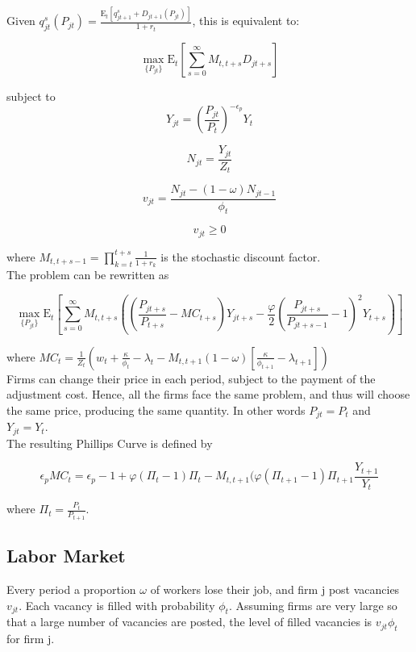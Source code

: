 \documentclass[titlepage]{\econtex}\providecommand{\texname}{Dissertation-Proposal}
\begin{document}
  
Given $q^{s}_{jt}\left(P_{jt}\right) = \frac{\mathrm{E}_{t}\left[q^{s}_{jt+1} + D_{jt+1}\left(P_{jt}\right)\right]}{1+r_{t}}$,  this is equivalent to: 
 
 $$\max_{\{P_{jt}\}} \mathrm{E}_{t}\left[\sum_{s=0}^{\infty}  M_{t,t+s}D_{jt+s} \right]$$
 
subject to $$Y_{jt} = \left(\frac {P_{jt}}{P_{t}}\right)^{- \epsilon_{p}} Y_{t}$$

$$ N_{jt} =  \frac{Y_{jt}} {Z_{t}} $$ 


$$ v_{jt} =  \frac{ N_{jt} - (1-\omega)N_{jt-1}}{\phi_{t}} $$

$$ v_{jt} \geq 0$$
 
where $M_{t, t+s-1} = \prod_{k=t}^{t+s} \frac{1}{1+r_{k}}$ is the stochastic discount factor. \\

The problem can be rewritten as 

$$\max_{\{P_{jt}\}} \mathrm{E}_{t}\left[\sum_{s=0}^{\infty}  M_{t,t+s} \left( \left( \frac{P_{jt+s}}{P_{t+s}} - MC_{t+s}\right)Y_{jt+s} -  \frac{\varphi}{2}\left( \frac{P_{jt+s}}{P_{jt+s-1}} - 1\right)^{2} Y_{t+s} \right)\right]$$


where $MC_{t} = \frac{1}{Z_{t}} \left( w_{t} + \frac{\kappa}{\phi_{t}} - \lambda_{t} - M_{t,t+1} (1-\omega) \left[  \frac{\kappa}{\phi_{t+1}} - \lambda_{t+1} \right] \right)$ \\



Firms can change their price in each period, subject to the payment of the adjustment cost.
Hence, all the firms face the same problem, and thus will choose the same price, producing the same quantity. In other words $P_{jt} =P_{t}$ and $Y_{jt} =Y_{t}$.\\ 

The resulting Phillips Curve is defined by


$$ \epsilon_{p} MC_{t} = \epsilon_{p} - 1 + \varphi ( \Pi_{t} -1) \Pi_{t} - M_{t,t+1} ( \varphi (\Pi_{t+1} -1 ) \Pi_{t+1} \frac{Y_{t+1}}{Y_{t}}$$

where $ \Pi_{t} = \frac{P_{t}}{P_{t+1}}$.



\hypertarget{Labor Market}{}
\subsection{Labor Market}

Every period a proportion $\omega$ of workers lose their job, and firm j post vacancies $v_{jt}$. Each vacancy is filled with probability $\phi_{t}$. Assuming firms are very large so that a large number of vacancies are posted, the level of filled vacancies is $v_{jt}\phi_{t}$ for firm j.
\end{document}
